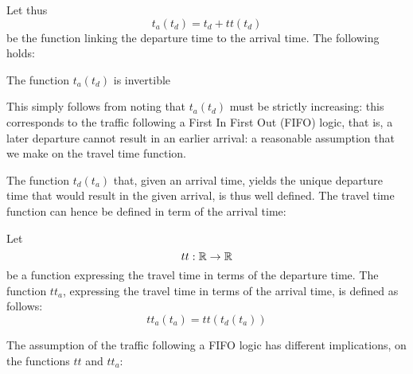 Let thus
\begin{equation}
  \label{eq:t_a-t_d}
  t_a(t_d) = t_d + tt(t_d)
\end{equation}
be the function linking the departure time to the arrival time.
The following holds:
\begin{obs}
  \label{obs:inv-t_a}
  The function \(t_a(t_d)\) is invertible
\end{obs}
This simply follows from noting that  \(t_a(t_d)\) must be strictly increasing:
this corresponds to the traffic following a First In First Out (FIFO) logic,
that is, a later departure cannot result in an earlier arrival:
a reasonable assumption that we make on the travel time function.

The function \(t_d(t_a)\) that, given an arrival time,
yields the unique departure time that would result in the given arrival,
is thus well defined.
The travel time function can hence be defined in term of the arrival time:
\begin{definition}
  \label{def:tta}
  Let
  \begin{equation*}
    tt:\mathbb{R} \rightarrow \mathbb{R}
  \end{equation*}
  be a function expressing the travel time in terms of the departure time.
  The function \(tt_a\), expressing the travel time in terms of the arrival time, is defined as follows:
  \begin{equation*}
    tt_a(t_a) = tt(t_d(t_a))
  \end{equation*}
\end{definition}

The assumption of the traffic following a FIFO logic has different implications,
on the functions \(tt\) and \(tt_a\):

